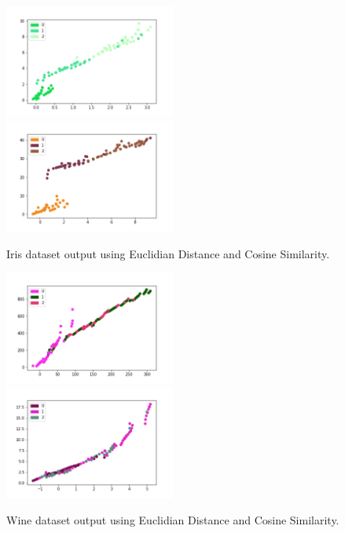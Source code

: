\documentclass[a4paper]{article}
\begin{document}
  \begin{figure}[htb]
    \includegraphics[width=0.5\textwidth]{../output/iris_euclidian_distance_1.png}
    \includegraphics[width=0.5\textwidth]{../output/iris_angle_1.png}
    \caption{Iris dataset output using Euclidian Distance and Cosine Similarity.}
    \label{iris}
  \end{figure}

  \begin{figure}[htb]
    \includegraphics[width=0.5\textwidth]{../output/wine_euclidian_distance_1.png}
    \includegraphics[width=0.5\textwidth]{../output/wine_angle_1.png}
    \caption{Wine dataset output using Euclidian Distance and Cosine Similarity.}
  \end{figure}
  
  \newpage
  \printbibliography
\end{document}
